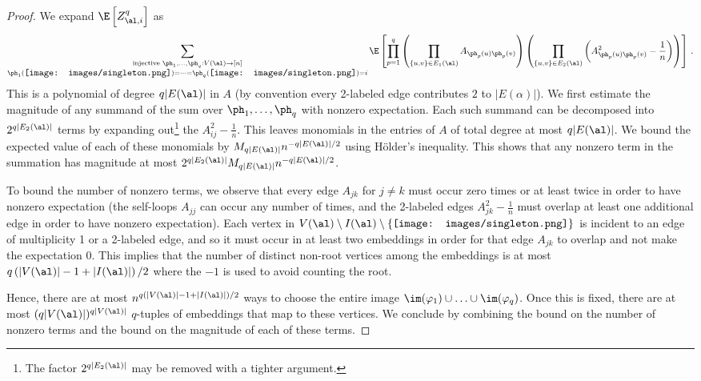 \documentclass[12pt]{article}
\newcommand{\rootpic}{\vcenter{\hbox{\texttt{[image: images/singleton.png]}}}}
\newcommand{\smallrootpic}{\vcenter{\hbox{\texttt{[image: images/singleton.png]}}}}
\begin{document}
\begin{proof}
    We expand $\E\left[Z_{\al,i}^q\right]$ as
    \begin{align*}
         \sum_{\substack{\text{injective }\ph_1,\ldots,\ph_q : V(\al) \to [n]\\\ph_1(\smallrootpic) = \cdots=\ph_q(\smallrootpic)=i}} \E \left[\prod_{p=1}^q \left(\prod_{\{u,v\} \in E_1(\al)} A_{\ph_p(u)\ph_p(v)} \right)\left(\prod_{\{u,v\} \in E_2(\al)} \left(A_{\ph_p(u)\ph_p(v)}^2-\frac 1 n\right) \right)\right]\,.
    \end{align*}
    This is a polynomial of degree $q|E(\al)|$ in $A$ (by convention every 2-labeled edge contributes $2$ to $|E(\alpha)|$).
    We first estimate the magnitude of any summand of the sum over $\ph_1,\ldots,\ph_q$ with nonzero expectation. Each such summand can be decomposed into $2^{q|E_2(\al)|}$ terms by expanding out\footnote{The factor $2^{q|E_2(\al)|}$ may be removed with a tighter argument.} the $A_{ij}^2 - \frac{1}{n}$. This leaves monomials in the entries of $A$ of total degree at most $q|E(\al)|$. We bound the expected value of each of these monomials by $M_{q|E(\al)|} n^{-q|E(\al)|/2}$ using Hölder's inequality. This shows that any nonzero term in the summation has magnitude at most $2^{q|E_2(\al)|} M_{q|E(\al)|} n^{-q|E(\al)|/2}$.

    To bound the number of nonzero terms,
    we observe that every edge $A_{jk}$ for $j \neq k$ must occur
    zero times or at least twice in order to have nonzero expectation
    (the self-loops $A_{jj}$ can occur any number of times,
    and the 2-labeled edges $A_{jk}^2 - \frac 1 n$ must overlap at least one additional edge in order to have nonzero expectation).
    Each vertex in $V(\al)\setminus I(\al)\setminus \{\rootpic\}$ is incident to an edge of multiplicity
    1 or a 2-labeled edge, and so it must occur in at least two embeddings in order for that edge
    $A_{jk}$ to overlap and not make the expectation 0.
    This implies that the number of distinct non-root vertices among
    the embeddings is at most $q\left(|V(\al)|-1 +|I(\al)|\right)/2$ where the $-1$ is used to avoid counting the root. 

    Hence, there are at most $n^{q\left(|V(\al)|-1 +|I(\al)|\right)/2}$ ways to choose the entire image $\im(\varphi_1) \cup \ldots\cup  \im(\varphi_q)$.
    Once this is fixed, there are at most
    $(q|V(\al)|)^{q|V(\al)|}$ $q$-tuples of embeddings that map to these vertices. We conclude by combining the bound on the number of nonzero terms and the bound on the magnitude of each of these terms.
\end{proof}
\end{document}
